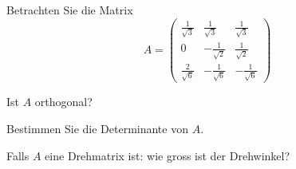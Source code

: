Betrachten Sie die Matrix
\[
A=
\begin{pmatrix}
\frac1{\sqrt{3}}&\frac1{\sqrt{3}}&\frac1{\sqrt{3}}\\
0&-\frac1{\sqrt{2}}&\frac1{\sqrt{2}}\\
\frac2{\sqrt{6}}&-\frac1{\sqrt{6}}&-\frac1{\sqrt{6}}
\end{pmatrix}
\]
\begin{teilaufgaben}
\item
Ist $A$ orthogonal?
\item
Bestimmen Sie die Determinante von $A$.
\item
Falls $A$ eine  Drehmatrix ist: wie gross ist der Drehwinkel?
\end{teilaufgaben}


